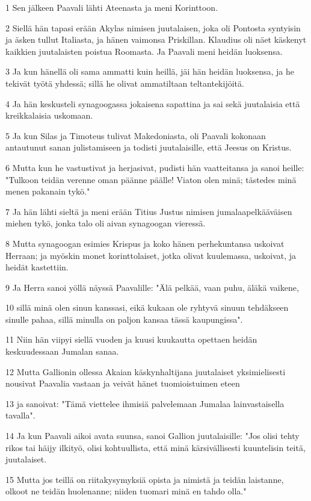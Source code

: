 \par 1 Sen jälkeen Paavali lähti Ateenasta ja meni Korinttoon.
\par 2 Siellä hän tapasi erään Akylas nimisen juutalaisen, joka oli Pontosta syntyisin ja äsken tullut Italiasta, ja hänen vaimonsa Priskillan. Klaudius oli näet käskenyt kaikkien juutalaisten poistua Roomasta. Ja Paavali meni heidän luoksensa.
\par 3 Ja kun hänellä oli sama ammatti kuin heillä, jäi hän heidän luoksensa, ja he tekivät työtä yhdessä; sillä he olivat ammatiltaan teltantekijöitä.
\par 4 Ja hän keskusteli synagoogassa jokaisena sapattina ja sai sekä juutalaisia että kreikkalaisia uskomaan.
\par 5 Ja kun Silas ja Timoteus tulivat Makedoniasta, oli Paavali kokonaan antautunut sanan julistamiseen ja todisti juutalaisille, että Jeesus on Kristus.
\par 6 Mutta kun he vastustivat ja herjasivat, pudisti hän vaatteitansa ja sanoi heille: "Tulkoon teidän verenne oman päänne päälle! Viaton olen minä; tästedes minä menen pakanain tykö."
\par 7 Ja hän lähti sieltä ja meni erään Titius Justus nimisen jumalaapelkääväisen miehen tykö, jonka talo oli aivan synagoogan vieressä.
\par 8 Mutta synagoogan esimies Krispus ja koko hänen perhekuntansa uskoivat Herraan; ja myöskin monet korinttolaiset, jotka olivat kuulemassa, uskoivat, ja heidät kastettiin.
\par 9 Ja Herra sanoi yöllä näyssä Paavalille: "Älä pelkää, vaan puhu, äläkä vaikene,
\par 10 sillä minä olen sinun kanssasi, eikä kukaan ole ryhtyvä sinuun tehdäkseen sinulle pahaa, sillä minulla on paljon kansaa tässä kaupungissa".
\par 11 Niin hän viipyi siellä vuoden ja kuusi kuukautta opettaen heidän keskuudessaan Jumalan sanaa.
\par 12 Mutta Gallionin ollessa Akaian käskynhaltijana juutalaiset yksimielisesti nousivat Paavalia vastaan ja veivät hänet tuomioistuimen eteen
\par 13 ja sanoivat: "Tämä viettelee ihmisiä palvelemaan Jumalaa lainvastaisella tavalla".
\par 14 Ja kun Paavali aikoi avata suunsa, sanoi Gallion juutalaisille: "Jos olisi tehty rikos tai häijy ilkityö, olisi kohtuullista, että minä kärsivällisesti kuuntelisin teitä, juutalaiset.
\par 15 Mutta jos teillä on riitakysymyksiä opista ja nimistä ja teidän laistanne, olkoot ne teidän huolenanne; niiden tuomari minä en tahdo olla."
